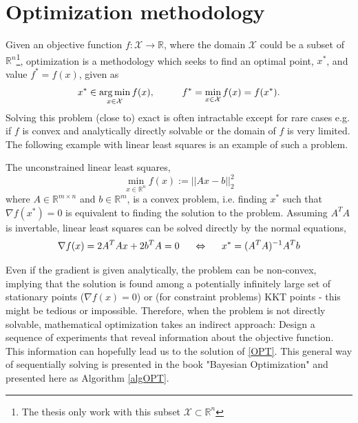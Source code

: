 \section{Optimization methodology}
Given an objective function $f: \mathcal{X} \rightarrow \mathbb{R}$, where the domain $\mathcal{X}$
could be a subset of $\mathbb{R}^n$\footnote{The thesis only work with this subset $\mathcal{X}
\subset \mathbb{R}^n$}, optimization is a methodology which seeks to find an optimal point, $x^*$,
and value $f^* = f(x)$, given as
\begin{align}\label{OPT}
    x^* \in \operatorname*{arg\,min}_{x \in \mathcal{X}} f(x), \hspace{1cm} f^* = \min_{x \in \mathcal{X}} f(x) = f(x^*).
\end{align}
Solving this problem (close to) exact is often intractable except for rare cases e.g. if $f$ is 
convex and analytically directly solvable or the domain of $f$ is very limited. The following example
with linear least squares is an example of such a problem. 

\begin{testexample}
    The unconstrained linear least squares, $$\min_{x\in \mathbb{R}^n} f(x) := ||Ax-b||_2^2$$
    where $A \in \mathbb{R}^{m\times n}$ and $b \in \mathbb{R}^m$, is a convex problem,
    i.e. finding $x^*$ such that $\nabla f(x^*) = 0$ is equivalent to finding the solution
    to the problem. Assuming $A^TA$ is invertable, linear least squares can be solved
    directly by the normal equations, 
    $$\nabla f(x) = 2A^TAx + 2b^TA = 0 \hspace{0.5cm} \Leftrightarrow \hspace{0.5cm} x^* = (A^TA)^{-1} A^Tb$$
\end{testexample}
Even if the gradient is given analytically, the problem can be non-convex, implying that the
solution is found among a potentially infinitely large set of stationary points ($\nabla f(x) = 0$)
or (for constraint problems) KKT points \cite{boyd2004convex} - this might be tedious or impossible.
Therefore, when the problem is not directly solvable, mathematical optimization takes an indirect
approach: Design a sequence of experiments that reveal information about the objective function.
This information can hopefully lead us to the solution of \eqref{OPT}. This general way of
sequentially solving is presented in the book "Bayesian Optimization" \cite{bayesoptbook} and
presented here as Algorithm \ref{algOPT}. 

